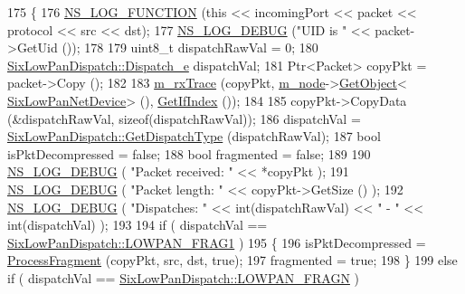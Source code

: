 \begin{DoxyCode}
175 \{
176   \hyperlink{log-macros-disabled_8h_a90b90d5bad1f39cb1b64923ea94c0761}{NS\_LOG\_FUNCTION} (\textcolor{keyword}{this} << incomingPort << packet << protocol << src << dst);
177   \hyperlink{group__logging_ga413f1886406d49f59a6a0a89b77b4d0a}{NS\_LOG\_DEBUG} (\textcolor{stringliteral}{"UID is "} << packet->GetUid ());
178 
179   uint8\_t dispatchRawVal = 0;
180   \hyperlink{classns3_1_1SixLowPanDispatch_aa51561db1ae4239db574d31d7aebbb5f}{SixLowPanDispatch::Dispatch\_e} dispatchVal;
181   Ptr<Packet> copyPkt = packet->Copy ();
182 
183   \hyperlink{classns3_1_1SixLowPanNetDevice_a868eb6580b5eced376dadafa67aeda6b}{m\_rxTrace} (copyPkt, \hyperlink{classns3_1_1SixLowPanNetDevice_a3f287ff63be440ab2978697b1d9b26a5}{m\_node}->\hyperlink{classns3_1_1Object_a13e18c00017096c8381eb651d5bd0783}{GetObject}<
      \hyperlink{classns3_1_1SixLowPanNetDevice_afb90a509d87f24373689a40f459d7ff6}{SixLowPanNetDevice}> (), \hyperlink{classns3_1_1SixLowPanNetDevice_a48cd7b76a59b506df8d8a7d8604f66b3}{GetIfIndex} ());
184 
185   copyPkt->CopyData (&dispatchRawVal, \textcolor{keyword}{sizeof}(dispatchRawVal));
186   dispatchVal = \hyperlink{classns3_1_1SixLowPanDispatch_a8405023ddddc8aee8825d743cae6ec21}{SixLowPanDispatch::GetDispatchType} (dispatchRawVal);
187   \textcolor{keywordtype}{bool} isPktDecompressed = \textcolor{keyword}{false};
188   \textcolor{keywordtype}{bool} fragmented = \textcolor{keyword}{false};
189 
190   \hyperlink{group__logging_ga413f1886406d49f59a6a0a89b77b4d0a}{NS\_LOG\_DEBUG} ( \textcolor{stringliteral}{"Packet received: "} << *copyPkt );
191   \hyperlink{group__logging_ga413f1886406d49f59a6a0a89b77b4d0a}{NS\_LOG\_DEBUG} ( \textcolor{stringliteral}{"Packet length: "} << copyPkt->GetSize () );
192   \hyperlink{group__logging_ga413f1886406d49f59a6a0a89b77b4d0a}{NS\_LOG\_DEBUG} ( \textcolor{stringliteral}{"Dispatches: "} << \textcolor{keywordtype}{int}(dispatchRawVal) << \textcolor{stringliteral}{" - "} << \textcolor{keywordtype}{int}(dispatchVal) );
193 
194   \textcolor{keywordflow}{if} ( dispatchVal == \hyperlink{classns3_1_1SixLowPanDispatch_aa51561db1ae4239db574d31d7aebbb5fab747444deb8d3cccddf5f0b521661447}{SixLowPanDispatch::LOWPAN\_FRAG1} )
195     \{
196       isPktDecompressed = \hyperlink{classns3_1_1SixLowPanNetDevice_a8ae23f88e38059a0096bf87e58007240}{ProcessFragment} (copyPkt, src, dst, \textcolor{keyword}{true});
197       fragmented = \textcolor{keyword}{true};
198     \}
199   \textcolor{keywordflow}{else} \textcolor{keywordflow}{if} ( dispatchVal == \hyperlink{classns3_1_1SixLowPanDispatch_aa51561db1ae4239db574d31d7aebbb5fa53d64943ad3b50c4a431de58746b97ee}{SixLowPanDispatch::LOWPAN\_FRAGN} )

\end{DoxyCode}
